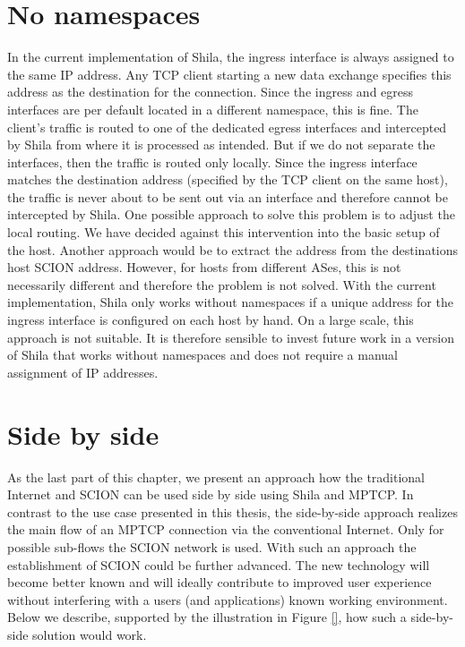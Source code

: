 \section*{No namespaces}

In the current implementation of Shila, the ingress interface is always assigned to the same IP address. Any TCP client starting a new data exchange specifies this address as the destination for the connection. Since the ingress and egress interfaces are per default located in a different namespace, this is fine. The client's traffic is routed to one of the dedicated egress interfaces and intercepted by Shila from where it is processed as intended. But if we do not separate the interfaces, then the traffic is routed only locally. Since the ingress interface matches the destination address (specified by the TCP client on the same host), the traffic is never about to be sent out via an interface and therefore cannot be intercepted by Shila. One possible approach to solve this problem is to adjust the local routing. We have decided against this intervention into the basic setup of the host. Another approach would be to extract the address from the destinations host SCION address. However, for hosts from different ASes, this is not necessarily different and therefore the problem is not solved.  With the current implementation, Shila only works without namespaces if a unique address for the ingress interface is configured on each host by hand. On a large scale, this approach is not suitable. It is therefore sensible to invest future work in a version of Shila that works without namespaces and does not require a manual assignment of IP addresses.

\section*{Side by side}

As the last part of this chapter, we present an approach how the traditional Internet and SCION can be used side by side using Shila and MPTCP. In contrast to the use case presented in this thesis, the side-by-side approach realizes the main flow of an MPTCP connection via the conventional Internet. Only for possible sub-flows the SCION network is used. With such an approach the establishment of SCION could be further advanced. The new technology will become better known and will ideally contribute to improved user experience without interfering with a users (and applications) known working environment. Below we describe, supported by the illustration in Figure \ref{}, how such a side-by-side solution would work.

